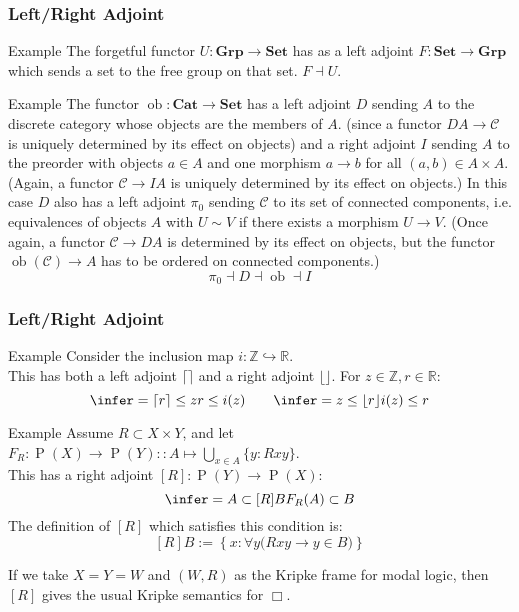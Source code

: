 \documentclass[UTF8,aspectratio=43,11pt,colorlinks,compress,openany]{beamer}%
\begin{document}
\begin{frame}\frametitle{Left/Right Adjoint}
\setlength\abovedisplayskip{0pt}
\setlength\belowdisplayskip{0pt}
\begin{block}{Example}
	The forgetful functor $U: \mathbf{Grp}\to\mathbf{Set}$ has as a left adjoint $F: \mathbf{Set}\to\mathbf{Grp}$ which sends a set to the free group on that set. $F\dashv U$.
\end{block}
\begin{block}{Example}
	The functor $\operatorname{ob}: \mathbf{Cat}\to\mathbf{Set}$ has a left adjoint $D$ sending $A$ to the discrete category whose objects are the members of $A$. (since a functor $DA\to \mathcal{C}$ is uniquely determined by its effect on objects) and a right adjoint $I$ sending $A$ to the preorder with objects $a\in A$ and one morphism $a\to b$ for all $(a,b)\in A\times A$. (Again, a functor $\mathcal{C}\to IA$ is uniquely determined by its effect on objects.) In this case $D$ also has a left adjoint $\pi_0$ sending $\mathcal{C}$ to its set of connected components, i.e. equivalences of objects $A$ with $U \sim V$ if there exists a morphism $U \to V$. (Once again, a functor $\mathcal{C}\to DA$ is determined by its effect on objects, but the functor $\operatorname{ob}(\mathcal{C})\to A$ has to be ordered on connected components.)
	\[\pi_0\dashv D\dashv \operatorname{ob}\dashv I\]
\end{block}
\end{frame}

\begin{frame}\frametitle{Left/Right Adjoint}
\setlength\abovedisplayskip{0pt}
\setlength\belowdisplayskip{0pt}
\begin{block}{Example}
Consider the inclusion map $i:\mathbb{Z}\hookrightarrow \mathbb{R}$.\\
This has both a left adjoint $\lceil\rceil$ and a right adjoint $\lfloor\rfloor$. For $z\in\mathbb{Z}, r\in\mathbb{R}$:
\[
\infer={\lceil r\rceil\leq z}{r\leq i(z)}\qquad
\infer={z\leq\lfloor r\rfloor}{i(z)\leq r}
\]
\end{block}
\begin{block}{Example}
Assume $R\subset X\times Y$, and let $F_R: \operatorname{P}(X)\to \operatorname{P}(Y) :: A\mapsto\bigcup\limits_{x\in A}\{y: Rxy\}$.\\
This has a right adjoint $[R]: \operatorname{P}(Y)\to \operatorname{P}(X)$:
\[\infer={A\subset [R]B}{F_R(A)\subset B}\]
The definition of $[R]$ which satisfies this condition is:
\[[R]B:=\left\{x: \forall y\big(Rxy\to y\in B\big)\right\}\]
\end{block}
If we take $X=Y=W$ and $(W,R)$ as the Kripke frame for modal logic, then $[R]$ gives the usual Kripke semantics for $\Box$.
\end{frame}
\end{document}
